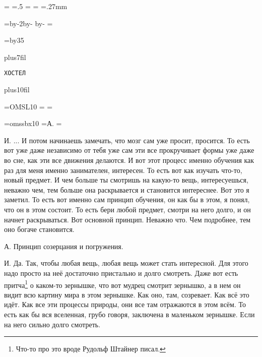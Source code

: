 \pdfpagewidth=297mm
\pdfpageheight=210mm
\pdfhorigin=1in
\pdfvorigin=0pt

\shhtotal=\pdfpagewidth
\htotal=.5\shhtotal
\vtotal=\pdfpageheight
\shoutline=0pt
\shstaplewidth=0pt
\shcrop=0pt
\shfootline={}
\shthickness=.27mm

\horigin=9mm
\hoffset=9mm
\hsize=\htotal \advance\hsize by-2\horigin \advance\hsize by-\hoffset
\advance\hsize by-\QUIRE
\output={\ifodd\pageno\else\hoffset=0pt\fi \plainoutput}

\vorigin=15mm
\vsize=\topskip \advance\vsize by35\baselineskip

\nopagenumbers
\topglue 0pt plus7fil
\centerline{\tt Х\qquad О\qquad С\qquad Т\qquad Е\qquad Л}
\vskip 0pt plus10fil
\eject
{}

\font\TENSL=OMSL10
\headline={\line{\hrulefill}}
\footline={\line{\hss\tenrm\folio\hss}}

\font\speakerF=omssbx10
\def\A{\item{\speakerF А.}}
\def\I{\item{\speakerF И.}}
=\hbox{\speakerF А.\enskip}
\parindent=


\I
... И потом начинаешь замечать, что мозг сам уже просит, просится.
То есть вот уже даже независимо от тебя уже сам эти все прокручивает формы уже даже во сне,
как эти все движения делаются.
И вот этот процесс именно обучения как раз для меня именно занимателен, интересен.
То есть вот как изучать что-то, новый предмет.
И чем больше ты смотришь на какую-то вещь, интересуешься, неважно чем,
тем больше она раскрывается и становится интереснее.
Вот это я заметил.
То есть вот именно сам принцип обучения, он как бы в этом, я понял, что он в этом состоит.
То есть бери любой предмет, смотри на него долго, и он начнет раскрываться.
Вот основной принцип.
Неважно что.
Чем подробнее, тем оно богаче становится.

\A
Принцип созерцания и погружения.

\I
Да.
Так, чтобы любая вещь, любая вещь может стать интересной.
Для этого надо просто на неё достаточно пристально и долго смотреть.
Даже вот есть притча\footnote*{Что-то про это вроде Рудольф Штайнер писал.} о каком-то зернышке, что вот мудрец смотрит зернышко,
а в нем он видит всю картину мира в этом зернышке.
Как оно, там, созревает.
Как всё это идёт.
Как все эти процессы природы, они все там отражаются в этом всём.
То есть как бы вся вселенная, грубо говоря, заключена в маленьком зернышке.
Если на него сильно долго смотреть.

